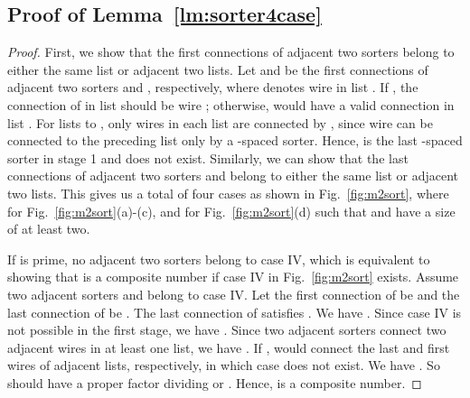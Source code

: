 \documentclass[10pt,journal,cspaper,compsoc]{IEEEtran}
\begin{document}
\subsection{Proof of Lemma~\ref{lm:sorter4case}}
\label{pf:sorter4case}
\begin{proof}
 First, we show that the first connections of adjacent two sorters belong to either the same list or adjacent two lists. Let  and  be the first connections of adjacent two sorters  and , respectively, where  denotes wire  in list .
 If , the connection of  in list  should be wire ; otherwise,  would have a valid connection in list . For lists  to , only wires  in each list are connected by , since wire  can be connected to the preceding list only by a -spaced sorter. Hence,  is the last -spaced sorter in stage 1 and  does not exist.
 Similarly, we can show that the last connections of adjacent two sorters  and  belong to either the same list or adjacent two lists. This gives us a total of four cases as shown in Fig.~\ref{fig:m2sort}, where  for Fig.~\ref{fig:m2sort}(a)-(c), and  for Fig.~\ref{fig:m2sort}(d) such that  and  have a size of at least two.

 If  is prime, no adjacent two sorters belong to case IV, which is equivalent to showing that  is a composite number if case IV in Fig.~\ref{fig:m2sort} exists. Assume two adjacent sorters  and  belong to case IV. Let the first connection of  be  and the last connection of  be . The last connection of  satisfies . We have . Since case IV is not possible in the first stage, we have . Since two adjacent sorters connect two adjacent wires in at least one list, we have .
 If ,  would connect the last and first wires of adjacent lists, respectively, in which case  does not exist. We have .
So  should have a proper factor dividing  or . Hence,  is a composite number.
\end{proof}
\end{document}
